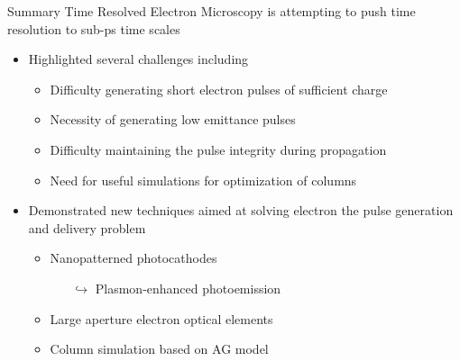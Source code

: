 \documentclass[mathserif]{beamer}
\begin{document}
\begin{frame}{Summary}
Time Resolved Electron Microscopy is attempting to push time resolution to sub-ps time scales
  \begin{itemize}
    \item<2-> Highlighted several challenges including
    \begin{itemize}
      \item<2-> Difficulty generating short electron pulses of sufficient charge
      \item<3-> Necessity of generating low emittance pulses
      \item<4-> Difficulty maintaining the pulse integrity during propagation
      \item<5-> Need for useful simulations for optimization of columns
    \end{itemize}
    \item<6-> Demonstrated new techniques aimed at solving electron the pulse generation and delivery problem
    \begin{itemize}
      \item<7-> Nanopatterned photocathodes
      \begin{itemize}
        \item [$\hookrightarrow$] Plasmon-enhanced photoemission
      \end{itemize}
      \item<8-> Large aperture electron optical elements
      \item<9-> Column simulation based on AG model
    \end{itemize}
  \end{itemize}
\end{frame}
\end{document}
